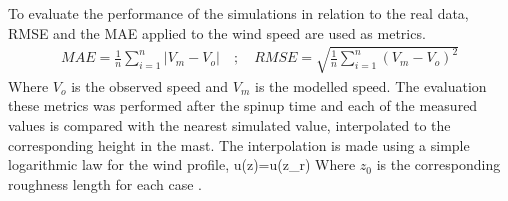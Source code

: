 To evaluate the performance of the simulations in relation to the real data, RMSE and the MAE applied to the wind speed are used as metrics.
\begin{align}
MAE = \frac{1}{n}\sum_{i=1}^n|V_m-V_o|\quad;\quad
RMSE= \sqrt{\frac{1}{n}\sum_{i=1}^n(V_m-V_o)^2}
\end{align}
Where $V_o$ is the observed speed and $V_m$ is the modelled speed. The evaluation these metrics was performed after the spinup time and each of the measured values is compared with the nearest simulated value, interpolated to the corresponding height in the mast. The interpolation is made using a simple logarithmic law for the wind profile,
\be 
u(z)=u(z_r)
\ee
Where $z_0$ is the corresponding roughness length for each case \citep{Pea2013,Bechmann2011}.








